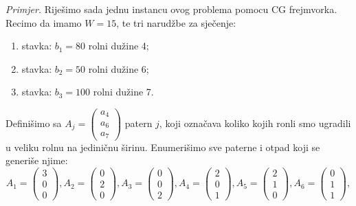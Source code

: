 \documentclass[a4paper, utf8, 11pt, colorlinks]{book}
\begin{document}
 \emph{Primjer.} Riješimo sada jednu instancu ovog problema pomocu CG frejmvorka. Recimo da imamo $W = 15$, te tri narudžbe za sječenje:
 \begin{enumerate}
 	\item stavka: $b_1=80$ rolni dužine 4;
 	\item stavka: $b_2=50$ rolni dužine 6;
 	\item stavka: $b_3=100$ rolni dužine 7. 
 \end{enumerate}
 Definišimo sa $A_j = \begin{pmatrix}
                          a_4 \\
                          a_6 \\
                          a_7
                   \end{pmatrix}$
                 patern $j$, koji označava koliko   kojih ronli smo ugradili u veliku rolnu na jediničnu širinu. Enumerišimo sve paterne i otpad koji se generiše njime: 
               $$A_1 = 
               \begin{pmatrix}
               	     3 \\
               	     0 \\
               	     0  
               \end{pmatrix},
               A_2=\begin{pmatrix}
                 	0 \\
                	2 \\
                	0  
               \end{pmatrix}, 
           A_3=\begin{pmatrix}
           	0 \\
           	0 \\
           	2  
         \end{pmatrix},
           A_4=  \begin{pmatrix}
           	2 \\
           	0 \\
           	1  
           \end{pmatrix},
       A_5 = \begin{pmatrix}
       	2 \\
       	1 \\
       	0  
       \end{pmatrix},
   A_6 =\begin{pmatrix}
      	0 \\
        1 \\
      	1  
   \end{pmatrix},$$
\end{document}

